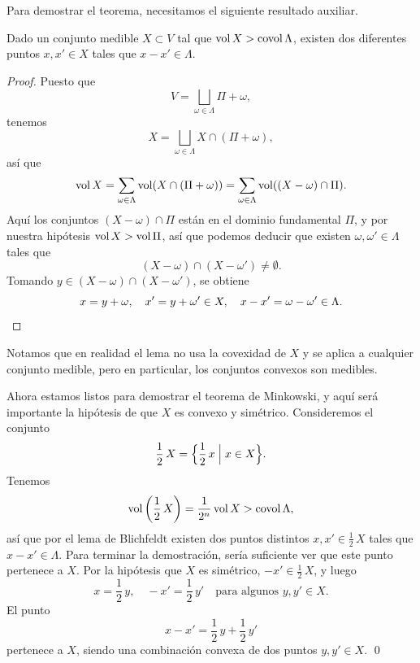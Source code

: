 Para demostrar el teorema, necesitamos el siguiente resultado auxiliar.

\begin{lema}
  Dado un conjunto medible $X\subset V$ tal que $\operatorname{vol} X > \operatorname{covol} \Lambda$,
  existen dos diferentes puntos $x,x'\in X$ tales que $x-x'\in \Lambda$.

  \begin{proof}
    Puesto que
    $$V = \bigsqcup_{\omega\in \Lambda} \Pi + \omega,$$
    tenemos
    $$X = \bigsqcup_{\omega\in \Lambda} X \cap (\Pi + \omega),$$
    así que
    $$\operatorname{vol} X = \sum_{\omega\in \Lambda} \operatorname{vol} (X \cap (\Pi + \omega)) = \sum_{\omega\in \Lambda} \operatorname{vol} ((X-\omega) \cap \Pi).$$
    Aquí los conjuntos $(X-\omega) \cap \Pi$ están en el dominio fundamental
    $\Pi$, y por nuestra hipótesis $\operatorname{vol} X > \operatorname{vol} \Pi$, así que podemos
    deducir que existen $\omega, \omega'\in \Lambda$ tales que
    $$(X-\omega) \cap (X-\omega') \ne \emptyset.$$
    Tomando $y \in (X-\omega) \cap (X-\omega')$, se obtiene
    \[ x = y + \omega, \quad x' = y + \omega' \in X, \quad
       x - x' = \omega-\omega' \in \Lambda. \qedhere \]
  \end{proof}
\end{lema}

Notamos que en realidad el lema no usa la covexidad de $X$ y se aplica a
cualquier conjunto medible, pero en particular, los conjuntos convexos son
medibles.

\vspace{1em}

Ahora estamos listos para demostrar el teorema de Minkowski, y aquí será
importante la hipótesis de que $X$ es convexo y simétrico. Consideremos
el conjunto
$$\frac{1}{2}\,X = \Bigl\{ \frac{1}{2}\,x \Bigm| x \in X \Bigr\}.$$
Tenemos
$$\operatorname{vol} \left(\frac{1}{2}\,X\right) = \frac{1}{2^n} \operatorname{vol} X > \operatorname{covol} \Lambda,$$
así que por el lema de Blichfeldt existen dos puntos distintos
$x,x' \in \frac{1}{2}\,X$ tales que $x-x' \in \Lambda$. Para terminar la
demostración, sería suficiente ver que este punto pertenece a $X$. Por la
hipótesis que $X$ es simétrico, $-x'\in \frac{1}{2}\,X$, y luego
$$x = \frac{1}{2}\,y, \quad -x' = \frac{1}{2}\,y' \quad\text{para algunos }y,y'\in X.$$
El punto
$$x - x' = \frac{1}{2}\,y + \frac{1}{2}\,y'$$
pertenece a $X$, siendo una combinación convexa de dos puntos $y,y'\in X$. \qed

\vspace{1em}

